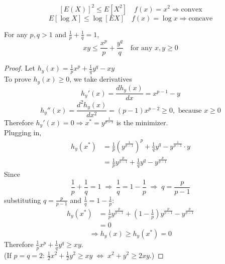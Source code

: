 \begin{example}
    \[[E(X)]^2 \leq E[X^2] \quad f(x) = x^2 \Rightarrow \text{convex}\]
    \[E[\log X] \leq \log [EX] \quad f(x) = \log x \Rightarrow \text{concave}\]
\end{example}

\begin{reqproof}
\begin{lemma}
    For any $p, q > 1$ and $\frac{1}{p}+ \frac{1}{q} = 1$,
    \[xy \leq \frac{x^p}{p} + \frac{y^q}{q} \quad \text{for any }x,y \geq 0 \]
    \begin{proof}
    Let $h_y(x) = \frac{1}{p}x^p + \frac{1}{q}y^q -xy$
    \\To prove $h_y(x) \geq 0$, we take derivatives
    \[h_y'(x) = \frac{dh_y(x)}{dx} = x^{p-1} - y\]
    \[h_y''(x) = \frac{d^2h_y(x)}{dx^2} = (p-1)x^{p-2} \geq 0, \text{ because } x \geq 0\]
    Therefore $h_y'(x) = 0 \Rightarrow x^* = y^{\frac{1}{p-1}}$ is the minimizer.
    \\Plugging in,
    \begin{align*}
        h_y(x^*) &= \frac{1}{p}\left(y^{\frac{1}{p-1}}\right)^p + \frac{1}{q}y^q - y^{\frac{1}{p-1}} \cdot y\\
        &= \frac{1}{p}y^{\frac{p}{p-1}} + \frac{1}{q}y^q - y^{\frac{p}{p-1}}
    \end{align*}
    Since
    \[\frac{1}{p}+\frac{1}{q} = 1 \;\Rightarrow\; \frac{1}{q} = 1 - \frac{1}{p} \;\Rightarrow\; q = \frac{p}{p-1}\]
    substituting $q = \frac{p}{p-1}$ and $\frac{1}{q} = 1 - \frac{1}{p}$:
    \begin{align*}
        h_y(x^*) &= \frac{1}{p}y^{\frac{p}{p-1}} + \left(1-\frac{1}{p}\right)y^{\frac{p}{p-1}} - y^{\frac{p}{p-1}}\\
        &= 0
    \end{align*}
    \[\Rightarrow h_y(x) \geq h_y(x^*) = 0\]
    Therefore $\frac{1}{p}x^p + \frac{1}{q}y^q \geq xy$.
    \\(If $p=q=2$: $\frac{1}{2}x^2 + \frac{1}{2}y^2 \geq xy \;\Leftrightarrow\; x^2+y^2 \geq 2xy$.)
    \end{proof}
\end{lemma}
\end{reqproof}


